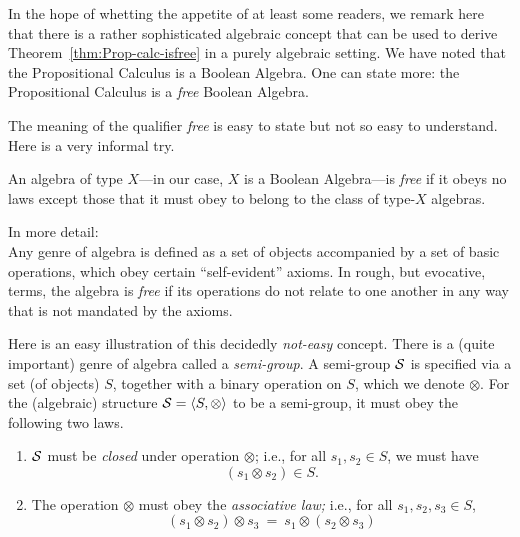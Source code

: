 In the hope of whetting the appetite of at least some readers, we remark here that there is a rather sophisticated algebraic concept that can be used to derive Theorem~\ref{thm:Prop-calc-isfree} in a purely algebraic setting.  We have noted that the Propositional Calculus is a Boolean Algebra.  One can state more: the Propositional Calculus is a {\em free} Boolean Algebra.

\smallskip

The meaning of the qualifier {\it free} is easy to state but not so easy to understand.  Here is a very informal try.

\smallskip

An algebra of type $X$---in our case, $X$ is a Boolean Algebra---is {\em free} if it obeys no laws except those that it must obey to belong to the class of type-$X$ algebras.

\smallskip


In more detail: \\
Any genre of algebra is defined as a set of objects accompanied by a set of basic operations, which obey certain ``self-evident'' axioms.  In rough, but evocative, terms, the algebra is {\em free} if its operations do not relate to one another in any way that is not mandated by the axioms.

\smallskip

 

Here is an easy illustration of this decidedly {\em not-easy} concept.  There is a (quite important) genre of algebra called a {\it semi-group}.  A semi-group $\mbox{$\cal S$}$ is specified via a set (of objects) $S$, together with a binary operation on $S$, which we denote $\otimes$.  For the (algebraic) structure $\mbox{$\cal S$} = \langle S, \otimes \rangle$ to be a semi-group, it must obey the following two laws.
\begin{enumerate}
\item
$\mbox{$\cal S$}$ must be {\it closed} under operation $\otimes$; i.e., for all $s_1, s_2 \in S$, we must have
\[ (s_1 \otimes s_2) \in S. \]
\medskip\item
The operation $\otimes$ must obey the {\em associative law;} i.e., for all $s_1, s_2, s_3 \in S$,
\[ (s_1 \otimes s_2) \otimes s_3 \ = \ s_1 \otimes (s_2 \otimes s_3) \]
\end{enumerate}


